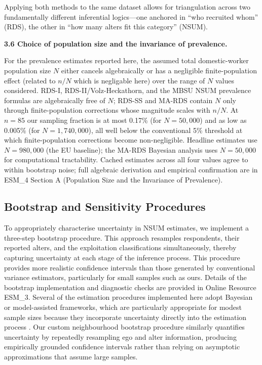 \documentclass[
  12pt,
  letterpaper,
  DIV=11,
  numbers=noendperiod]{scrartcl}
\begin{document}
Applying both methods to the same dataset allows for triangulation
across two fundamentally different inferential logics---one anchored in
``who recruited whom'' (RDS), the other in ``how many alters fit this
category'' (NSUM).

\textbf{3.6 Choice of population size and the invariance of prevalence.}

For the prevalence estimates reported here, the assumed total
domestic-worker population size \(N\) either cancels algebraically or
has a negligible finite-population effect (related to \(n/N\) which is
negligable here) over the range of \(N\) values considered. RDS-I,
RDS-II/Volz-Heckathorn, and the MBSU NSUM prevalence formulas are
algebraically free of \(N\); RDS-SS and MA-RDS contain \(N\) only
through finite-population corrections whose magnitude scales with
\(n/N\). At \(n = 85\) our sampling fraction is at most 0.17\% (for
\(N = 50{,}000\)) and as low as 0.005\% (for \(N = 1{,}740{,}000\)), all
well below the conventional 5\% threshold at which finite-population
corrections become non-negligible. Headline estimates use
\(N = 980{,}000\) (the EU baseline); the MA-RDS Bayesian analysis uses
\(N = 50{,}000\) for computational tractability. Cached estimates across
all four values agree to within bootstrap noise; full algebraic
derivation and empirical confirmation are in ESM\_4 Section A
(Population Size and the Invariance of Prevalence).

\subsection{Bootstrap and Sensitivity Procedures}\label{sec-bootstrap}

To appropriately characterise uncertainty in NSUM estimates, we
implement a three-step bootstrap procedure. This approach resamples
respondents, their reported alters, and the exploitation classifications
simultaneously, thereby capturing uncertainty at each stage of the
inference process. This procedure provides more realistic confidence
intervals than those generated by conventional variance estimators,
particularly for small samples such as ours. Details of the bootstrap
implementation and diagnostic checks are provided in Online Resource
ESM\_3. Several of the estimation procedures implemented here adopt
Bayesian or model-assisted frameworks, which are particularly
appropriate for modest sample sizes because they incorporate uncertainty
directly into the estimation process \autocite{gile18-methods}. Our
custom neighbourhood bootstrap procedure similarly quantifies
uncertainty by repeatedly resampling ego and alter information,
producing empirically grounded confidence intervals rather than relying
on asymptotic approximations that assume large samples.
\end{document}
